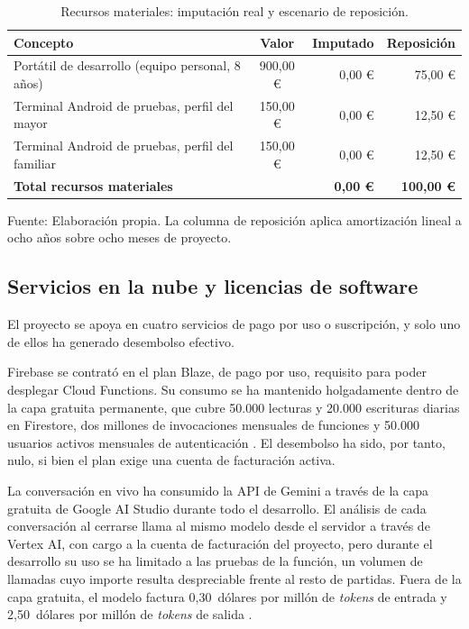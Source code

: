 \begin{table}[htbp]
    \centering
    \caption{Recursos materiales: imputación real y escenario de reposición.}
    \label{tab:coste-material}
    \begin{tabularx}{\textwidth}{@{}>{\RaggedRight\arraybackslash}X c r r@{}}
        \toprule
        \textbf{Concepto} & \textbf{Valor} & \textbf{Imputado} & \textbf{Reposición} \\
        \midrule
        Portátil de desarrollo (equipo personal, 8 años) & 900,00 € & 0,00 € & 75,00 € \\
        Terminal Android de pruebas, perfil del mayor    & 150,00 € & 0,00 € & 12,50 € \\
        Terminal Android de pruebas, perfil del familiar & 150,00 € & 0,00 € & 12,50 € \\
        \midrule
        \textbf{Total recursos materiales}               &          & \textbf{0,00 €} & \textbf{100,00 €} \\
        \bottomrule
    \end{tabularx}

    \vspace{2pt}
    {\footnotesize Fuente: Elaboración propia. La columna de reposición aplica amortización lineal a ocho
    años sobre ocho meses de proyecto.}
\end{table}

\subsection{Servicios en la nube y licencias de software}

El proyecto se apoya en cuatro servicios de pago por uso o suscripción, y solo uno de ellos ha generado
desembolso efectivo.

Firebase se contrató en el plan Blaze, de pago por uso, requisito para poder desplegar Cloud
Functions. Su consumo se ha mantenido holgadamente dentro de la capa gratuita permanente, que cubre 50.000
lecturas y 20.000 escrituras diarias en Firestore, dos millones de invocaciones mensuales de funciones y
50.000 usuarios activos mensuales de autenticación \citep{FirebasePricing}. El desembolso ha sido, por
tanto, nulo, si bien el plan exige una cuenta de facturación activa.

La conversación en vivo ha consumido la API de Gemini a través de la capa gratuita de Google AI Studio
durante todo el desarrollo. El análisis de cada conversación al cerrarse llama al mismo modelo desde el
servidor a través de Vertex AI, con cargo a la cuenta de facturación del proyecto, pero durante el
desarrollo su uso se ha limitado a las pruebas de la función, un volumen de llamadas cuyo importe resulta
despreciable frente al resto de partidas. Fuera de la capa gratuita, el modelo 
factura 0,30~dólares por millón de \textit{tokens} de entrada y 2,50~dólares por millón de \textit{tokens}
de salida \citep{GeminiPricing}.

